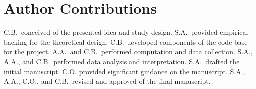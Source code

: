 \section{Author Contributions}%

C.B.~conceived of the presented idea and study design. 
S.A.~provided empirical backing for the theoretical design. 
C.B.~developed components of the code base for the project. 
A.A.~and C.B.~performed computation and data collection. 
S.A., A.A., and C.B.~performed data analysis and interpretation. 
S.A.~drafted the initial manuscript. 
C.O. provided significant guidance on the manuscript. 
S.A., A.A., C.O., and C.B.~revised and approved of the final manuscript. 